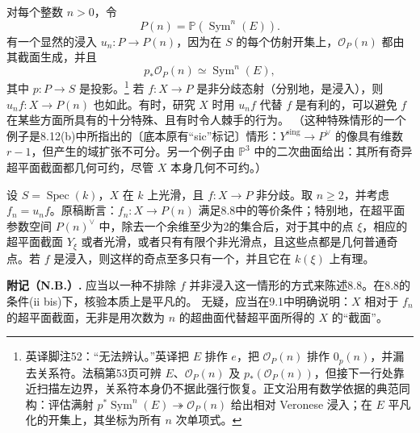 对每个整数 $n>0$，令
\[
P(n)=\mathbb P(\operatorname{Sym}^{n}(E)).
\]
有一个显然的浸入 $u_n:P\to P(n)$，因为在 $S$ 的每个仿射开集上，$\mathcal O_P(n)$ 都由其截面生成，并且
\[
p_*\mathcal O_P(n)\simeq\operatorname{Sym}^{n}(E),
\]
其中 $p:P\to S$ 是投影。\footnote{英译脚注52：“无法辨认。”英译把 $E$ 排作 $e$，把 $\mathcal O_P(n)$ 排作 $0_p(n)$，并漏去关系符。法稿第53页可辨 $E$、$\mathcal O_P(n)$ 及 $p_*(\mathcal O_P(n))$，但接下一行处靠近扫描左边界，关系符本身仍不据此强行恢复。正文沿用有数学依据的典范同构：评估满射 $p^*\operatorname{Sym}^{n}(E)\twoheadrightarrow\mathcal O_P(n)$ 给出相对 Veronese 浸入；在 $E$ 平凡化的开集上，其坐标为所有 $n$ 次单项式。}
若 $f:X\to P$ 是非分歧态射（分别地，是浸入），则 $u_n f:X\to P(n)$ 也如此。有时，研究 $X$ 时用 $u_n f$ 代替 $f$ 是有利的，可以避免 $f$ 在某些方面所具有的十分特殊、且有时令人棘手的行为。
（这种特殊情形的一个例子是8.12(b)中所指出的〔底本原有“sic”标记〕情形：$Y^{\mathrm{sing}}\to P^\vee$ 的像具有维数 $r-1$，但产生的域扩张不可分。另一个例子由 $\mathbb P^3$ 中的二次曲面给出：其所有奇异超平面截面都几何可约，尽管 $X$ 本身几何不可约。）

\medskip
{}
设 $S=\operatorname{Spec}(k)$，$X$ 在 $k$ 上光滑，且 $f:X\to P$ 非分歧。取 $n\ge2$，并考虑 $f_n=u_n f$。原稿断言：$f_n:X\to P(n)$ 满足8.8中的等价条件；特别地，在超平面参数空间 $P(n)^\vee$ 中，除去一个余维至少为2的集合后，对于其中的点 $\xi$，相应的超平面截面 $Y_\xi$ 或者光滑，或者只有有限个非光滑点，且这些点都是几何普通奇点。若 $f$ 是浸入，则这样的奇点至多只有一个，并且它在 $k(\xi)$ 上有理。

\medskip
\noindent\textbf{附记（N.B.）.}
应当以一种不排除 $f$ 并非浸入这一情形的方式来陈述8.8。在8.8的条件(ii bis)下，核验本质上是平凡的。
无疑，应当在9.1中明确说明：$X$ 相对于 $f_n$ 的超平面截面，无非是用次数为 $n$ 的超曲面代替超平面所得的 $X$ 的“截面”。

